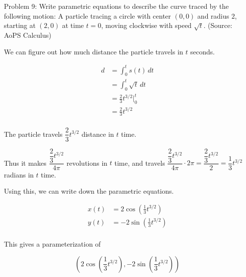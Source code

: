 Problem 9: Write parametric equations to describe the curve traced by the following motion: A particle tracing a circle with center $(0, 0)$ and radius $2$, starting at $(2, 0)$ at time $t = 0$, moving clockwise with speed $\sqrt t$. (Source: AoPS Calculus)

We can figure out how much distance the particle travels in $t$ seconds.

\begin{align*}
d &= \int_0^t s(t) \, dt \\
&= \int_0^t \sqrt t \, dt \\
&= \frac{2}{3} t^{3/2} \Bigg|_0^t \\
&= \frac{2}{3} t^{3/2} \\
\end{align*}

The particle travels $\dfrac{2}{3} t^{3/2}$ distance in $t$ time.

Thus it makes $\dfrac{\dfrac{2}{3} t^{3/2}}{4\pi}$ revolutions in $t$ time, and travels $\dfrac{\dfrac{2}{3} t^{3/2}}{4\pi} \cdot 2\pi = \dfrac{\dfrac{2}{3} t^{3/2}}{2} = \dfrac{1}{3} t^{3/2}$ radians in $t$ time.

Using this, we can write down the parametric equations.

\begin{align*}
x(t) &= 2 \cos \left( \frac{1}{3} t^{3/2} \right) \\
y(t) &= -2 \sin \left( \frac{1}{3} t^{3/2} \right) \\
\end{align*}

This gives a parameterization of

$$ \boxed{\left(2 \cos \left( \frac{1}{3} t^{3/2} \right), -2 \sin \left( \frac{1}{3} t^{3/2} \right)\right)} $$
